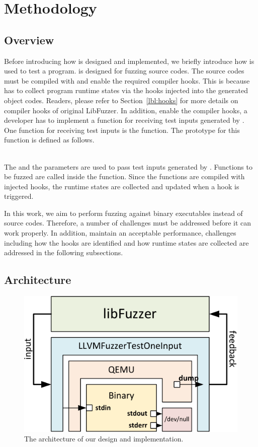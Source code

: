 
\section{Methodology}
\label{sec:method}

\subsection{Overview}

Before introducing how \sys is designed and implemented, we briefly introduce how \libfuzzer is used to test a program.
\libfuzzer is designed for fuzzing source codes.
The source codes must be compiled with  and enable the required compiler hooks.
This is because \libfuzzer has to collect program runtime states via the hooks injected into the generated object codes.
Readers, please refer to Section~\ref{lbl:hooks} for more details on compiler hooks of original LibFuzzer.
%
In addition, enable the compiler hooks, a developer has to implement a function for receiving test inputs generated by \libfuzzer.
One function for receiving test inputs is the  function. The prototype for this function is defined as follows.

\vspace*{3mm}
\noindent{}\\

\noindent The  and the  parameters are used to pass test inputs generated by \libfuzzer.
Functions to be fuzzed are called inside the  function.
Since the functions are compiled with injected hooks, the runtime states are collected and updated when a hook is triggered.

In this work, we aim to perform fuzzing against binary executables instead of source codes.
Therefore, a number of challenges must be addressed before it can work properly.
In addition, maintain an acceptable performance, challenges including how the hooks are identified and how runtime states are collected are addressed in the following subsections.

\subsection{Architecture}
\label{lbl:exec}

\begin{figure}
\centering
\includegraphics[width=.60\columnwidth]{images/arch.pdf}
\caption{The architecture of our design and implementation.}
\label{fig:arch}
\end{figure}

